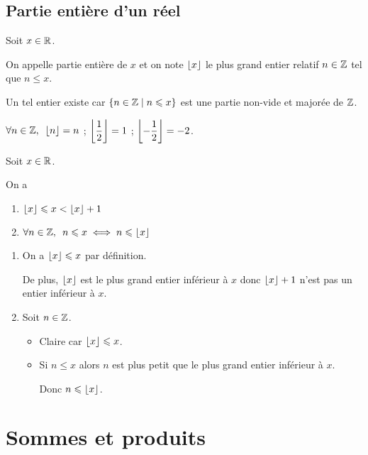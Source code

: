 \subsection{Partie entière d'un réel}

\begin{defi}
Soit \(x\in\mathbb{R}\).

On appelle partie entière de \(x\) et on note \(\left\lfloor x\right\rfloor\) le plus grand entier relatif \(n\in\mathbb{Z}\) tel que \(n\leq x\).

Un tel entier existe car \(\left\lbrace n\in\mathbb{Z}\;\middle|\; n\leqslant x\right\rbrace\) est une partie non-vide et majorée de \(\mathbb{Z}\).
\end{defi}

\begin{ex}
\(\quantifs{\forall n\in\Z}\floor{n}=n\) ; \(\left\lfloor\dfrac{1}{2}\right\rfloor=1\) ; \(\left\lfloor-\dfrac{1}{2}\right\rfloor=-2\).
\end{ex}

\begin{prop}
Soit \(x\in\mathbb{R}\).

On a \begin{enumerate}
\item \(\left\lfloor x\right\rfloor\leqslant x<\left\lfloor x\right\rfloor+1\)

\item \(\quantifs{\forall n\in\Z}n\leq x\ssi n\leq\floor{x}\)
\end{enumerate}
\end{prop}

\begin{dem}
\begin{enumerate}
\item On a \(\left\lfloor x\right\rfloor\leqslant x\) par définition.

De plus, \(\left\lfloor x\right\rfloor\) est le plus grand entier inférieur à \(x\) donc \(\left\lfloor x\right\rfloor+1\) n'est pas un entier inférieur à \(x\).

\item Soit \(n\in\mathbb{Z}\).

\begin{itemize}
\item[\imprec] Claire car \(\left\lfloor x\right\rfloor\leqslant x\).

\item[\impdir] Si \(n\leq x\) alors \(n\) est plus petit que le plus grand entier inférieur à \(x\).

Donc \(n\leqslant\left\lfloor x\right\rfloor\).
\end{itemize}
\end{enumerate}
\end{dem}

\section{Sommes et produits}

